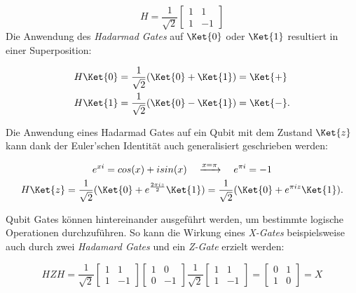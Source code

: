 \begin{equation}
    H = \frac{1}{\sqrt{2}} \begin{bmatrix}
        1 & 1 \\ 1 & -1
    \end{bmatrix}\end{equation}
Die Anwendung des \textit{Hadarmad Gates} auf \(\Ket{0}\) oder \(\Ket{1}\) resultiert in einer Superposition:

\begin{align*}
    H\Ket{0} & = \frac{1}{\sqrt{2}} (\Ket{0} + \Ket{1}) = \Ket{+}  \\
    H\Ket{1} & = \frac{1}{\sqrt{2}} (\Ket{0} - \Ket{1}) = \Ket{-}.
\end{align*}

Die Anwendung eines Hadarmad Gates auf ein Qubit mit dem Zustand \(\Ket{z}\) kann dank der Euler'schen Identität auch generalisiert geschrieben werden:

\begin{gather*}
    e^{x i} = cos(x) + i sin(x) \quad\xrightarrow{x=\pi}\quad e^{\pi i} = -1 \\
    H\Ket{z} = \frac{1}{\sqrt{2}} (\Ket{0} + e^{\frac{2\pi iz}{2}}\Ket{1}) = \frac{1}{\sqrt{2}} (\Ket{0} + e^{\pi iz}\Ket{1}).
\end{gather*}

Qubit Gates können hintereinander ausgeführt werden, um bestimmte logische Operationen durchzuführen. So kann die Wirkung eines \textit{X-Gates} beispielsweise auch durch zwei \textit{Hadamard Gates} und ein \textit{Z-Gate} erzielt werden:

\[
    HZH = \frac{1}{\sqrt{2}} \begin{bmatrix}
        1 & 1 \\ 1 & -1
    \end{bmatrix} \begin{bmatrix} 1 & 0 \\ 0 & -1 \end{bmatrix} \frac{1}{\sqrt{2}} \begin{bmatrix}
        1 & 1 \\ 1 & -1
    \end{bmatrix} = \begin{bmatrix} 0 & 1 \\ 1 & 0 \end{bmatrix} = X
\]

